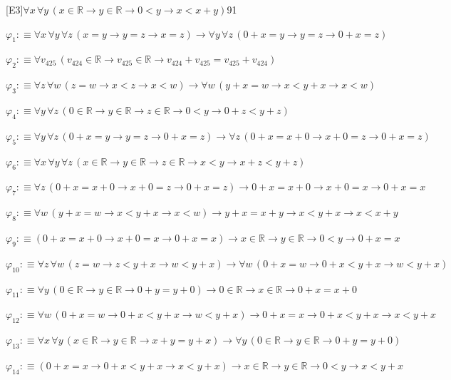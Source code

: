 \begin{fullproof}{[E3]}{$\forall x\,\forall y\,(x \in \mathbb{R} \to y \in \mathbb{R} \to 0 < y \to x < x + y)$}{91}
\begin{ptree}
\end{ptree}
\begin{abbrevlist}
\item $\varphi_{1} :\equiv \forall x\,\forall y\,\forall z\,(x = y \to y = z \to x = z) \to \forall y\,\forall z\,(0 + x = y \to y = z \to 0 + x = z)$
\item $\varphi_{2} :\equiv \forall v_{425}\,(v_{424} \in \mathbb{R} \to v_{425} \in \mathbb{R} \to v_{424} + v_{425} = v_{425} + v_{424})$
\item $\varphi_{3} :\equiv \forall z\,\forall w\,(z = w \to x < z \to x < w) \to \forall w\,(y + x = w \to x < y + x \to x < w)$
\item $\varphi_{4} :\equiv \forall y\,\forall z\,(0 \in \mathbb{R} \to y \in \mathbb{R} \to z \in \mathbb{R} \to 0 < y \to 0 + z < y + z)$
\item $\varphi_{5} :\equiv \forall y\,\forall z\,(0 + x = y \to y = z \to 0 + x = z) \to \forall z\,(0 + x = x + 0 \to x + 0 = z \to 0 + x = z)$
\item $\varphi_{6} :\equiv \forall x\,\forall y\,\forall z\,(x \in \mathbb{R} \to y \in \mathbb{R} \to z \in \mathbb{R} \to x < y \to x + z < y + z)$
\item $\varphi_{7} :\equiv \forall z\,(0 + x = x + 0 \to x + 0 = z \to 0 + x = z) \to 0 + x = x + 0 \to x + 0 = x \to 0 + x = x$
\item $\varphi_{8} :\equiv \forall w\,(y + x = w \to x < y + x \to x < w) \to y + x = x + y \to x < y + x \to x < x + y$
\item $\varphi_{9} :\equiv (0 + x = x + 0 \to x + 0 = x \to 0 + x = x) \to x \in \mathbb{R} \to y \in \mathbb{R} \to 0 < y \to 0 + x = x$
\item $\varphi_{10} :\equiv \forall z\,\forall w\,(z = w \to z < y + x \to w < y + x) \to \forall w\,(0 + x = w \to 0 + x < y + x \to w < y + x)$
\item $\varphi_{11} :\equiv \forall y\,(0 \in \mathbb{R} \to y \in \mathbb{R} \to 0 + y = y + 0) \to 0 \in \mathbb{R} \to x \in \mathbb{R} \to 0 + x = x + 0$
\item $\varphi_{12} :\equiv \forall w\,(0 + x = w \to 0 + x < y + x \to w < y + x) \to 0 + x = x \to 0 + x < y + x \to x < y + x$
\item $\varphi_{13} :\equiv \forall x\,\forall y\,(x \in \mathbb{R} \to y \in \mathbb{R} \to x + y = y + x) \to \forall y\,(0 \in \mathbb{R} \to y \in \mathbb{R} \to 0 + y = y + 0)$
\item $\varphi_{14} :\equiv (0 + x = x \to 0 + x < y + x \to x < y + x) \to x \in \mathbb{R} \to y \in \mathbb{R} \to 0 < y \to x < y + x$

\end{abbrevlist}
\end{fullproof}
